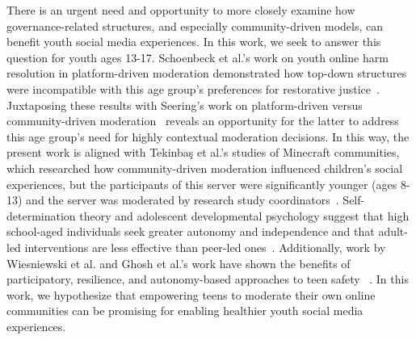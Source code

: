 There is an urgent need and opportunity to more closely examine how governance-related structures, and especially community-driven models, can benefit youth social media experiences. In this work, we seek to answer this question for youth ages 13-17. Schoenbeck et al.'s work on youth online harm resolution in platform-driven moderation demonstrated how top-down structures were incompatible with this age group's preferences for restorative justice~\cite{schoenebeck2021youth}. Juxtaposing these results with Seering's work on platform-driven versus community-driven moderation~\cite{seering2020reconsidering} reveals an opportunity for the latter to address this age group's need for highly contextual moderation decisions. In this way, the present work is aligned with Tekinbaş et al.'s studies of Minecraft communities, which researched how community-driven moderation influenced children's social experiences, but the participants of this server were significantly younger (ages 8-13) and the server was moderated by research study coordinators~\cite{tekinbas2021designing}. Self-determination theory and adolescent developmental psychology suggest that high school-aged individuals seek greater autonomy and independence and that adult-led interventions are less effective than peer-led ones~\cite{ryan2020intrinsic, deci2000and}. Additionally, work by Wiesniewski et al. and Ghosh et al.'s work have shown the benefits of participatory, resilience, and autonomy-based approaches to teen safety ~\cite{wisniewski2015resilience, wisniewski2017parental,ghosh2018safety, wisniewski2015preventative}. In this work, we hypothesize that empowering teens to moderate their own online communities can be promising for enabling healthier youth social media experiences.